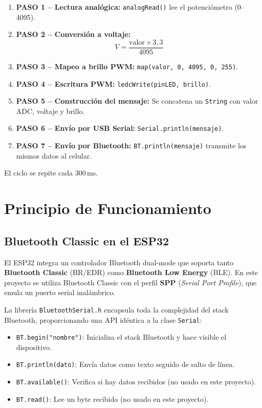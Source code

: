 \documentclass[12pt,a4paper]{article}
\begin{document}
\begin{enumerate}
    \item \textbf{PASO 1 -- Lectura analógica:} \texttt{analogRead()} lee el potenciómetro (0--4095).
    \item \textbf{PASO 2 -- Conversión a voltaje:}
    \begin{equation}
    V = \frac{\text{valor} \times 3{,}3}{4095}
    \label{eq:voltaje}
    \end{equation}
    \item \textbf{PASO 3 -- Mapeo a brillo PWM:} \texttt{map(valor, 0, 4095, 0, 255)}.
    \item \textbf{PASO 4 -- Escritura PWM:} \texttt{ledcWrite(pinLED, brillo)}.
    \item \textbf{PASO 5 -- Construcción del mensaje:} Se concatena un \texttt{String} con valor ADC, voltaje y brillo.
    \item \textbf{PASO 6 -- Envío por USB Serial:} \texttt{Serial.println(mensaje)}.
    \item \textbf{PASO 7 -- Envío por Bluetooth:} \texttt{BT.println(mensaje)} transmite los mismos datos al celular.
\end{enumerate}

El ciclo se repite cada 300\,ms.

\section{Principio de Funcionamiento}

\subsection{Bluetooth Classic en el ESP32}

El ESP32 integra un controlador Bluetooth dual-mode que soporta tanto \textbf{Bluetooth Classic} (BR/EDR) como \textbf{Bluetooth Low Energy} (BLE). En este proyecto se utiliza Bluetooth Classic con el perfil \textbf{SPP} (\textit{Serial Port Profile}), que emula un puerto serial inalámbrico.

La librería \texttt{BluetoothSerial.h} encapsula toda la complejidad del stack Bluetooth, proporcionando una API idéntica a la clase \texttt{Serial}:

\begin{itemize}
    \item \texttt{BT.begin("nombre")}: Inicializa el stack Bluetooth y hace visible el dispositivo.
    \item \texttt{BT.println(dato)}: Envía datos como texto seguido de salto de línea.
    \item \texttt{BT.available()}: Verifica si hay datos recibidos (no usado en este proyecto).
    \item \texttt{BT.read()}: Lee un byte recibido (no usado en este proyecto).
\end{itemize}
\end{document}
